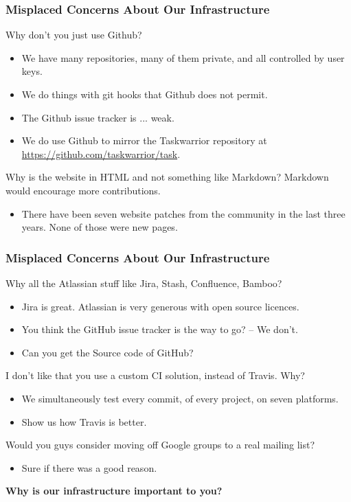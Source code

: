 \documentclass[t,handout]{beamer}
\begin{document}
\begin{frame}[fragile]\frametitle{Misplaced Concerns About Our Infrastructure}
    Why don't you just use Github?
    \begin{itemize}
        \item We have many repositories, many of them private, and all controlled by user keys.
        \item We do things with git hooks that Github does not permit.
        \item The Github issue tracker is ... weak.
        \item We do use Github to mirror the Taskwarrior repository at \href{https://github.com/taskwarrior/task}{https://github.com/taskwarrior/task}.
    \end{itemize}

    Why is the website in HTML and not something like Markdown? Markdown would encourage more contributions.
    \begin{itemize}
        \item There have been seven website patches from the community in the last three years. None of those were new pages.
    \end{itemize}
\end{frame}

\begin{frame}[fragile]\frametitle{Misplaced Concerns About Our Infrastructure}
    Why all the Atlassian stuff like Jira, Stash, Confluence, Bamboo?
    \begin{itemize}
        \item Jira is great. Atlassian is very generous with open source licences.
        \item You think the GitHub issue tracker is the way to go? -- We don't.
        \item Can you get the Source code of GitHub?
    \end{itemize}

    I don't like that you use a custom CI solution, instead of Travis. Why?
    \begin{itemize}
        \item We simultaneously test every commit, of every project, on seven platforms.
        \item Show us how Travis is better.
    \end{itemize}

    Would you guys consider moving off Google groups to a real mailing list?
    \begin{itemize}
        \item Sure if there was a good reason.
    \end{itemize}

    \textbf{Why is our infrastructure important to you?}
\end{frame}
\end{document}

